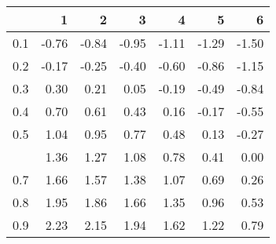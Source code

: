 
\begin{tabular}{lrrrrrr}
\toprule
  & 1 & 2 & 3 & 4 & 5 & 6\\
\midrule
0.1 & -0.76 & -0.84 & -0.95 & -1.11 & -1.29 & -1.50\\
0.2 & -0.17 & -0.25 & -0.40 & -0.60 & -0.86 & -1.15\\
0.3 & 0.30 & 0.21 & 0.05 & -0.19 & -0.49 & -0.84\\
0.4 & 0.70 & 0.61 & 0.43 & 0.16 & -0.17 & -0.55\\
0.5 & 1.04 & 0.95 & 0.77 & 0.48 & 0.13 & -0.27\\
\addlinespace
0.6 & 1.36 & 1.27 & 1.08 & 0.78 & 0.41 & 0.00\\
0.7 & 1.66 & 1.57 & 1.38 & 1.07 & 0.69 & 0.26\\
0.8 & 1.95 & 1.86 & 1.66 & 1.35 & 0.96 & 0.53\\
0.9 & 2.23 & 2.15 & 1.94 & 1.62 & 1.22 & 0.79\\
\bottomrule
\end{tabular}
